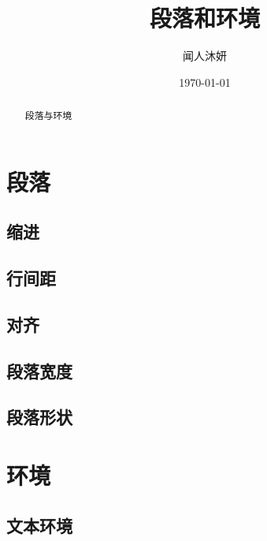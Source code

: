 \documentclass{ctexart}
\title{段落和环境}
\author{闻人沐妍}
\date{\today}
\begin{document}
    \maketitle

    \begin{abstract}
        段落与环境
    \end{abstract}

    \tableofcontents

    \section{段落}
        \subsection{缩进}

        \subsection{行间距}

        \subsection{对齐}

        \subsection{段落宽度}

        \subsection{段落形状}

    \section{环境}

        \subsection{文本环境}
\end{document}
